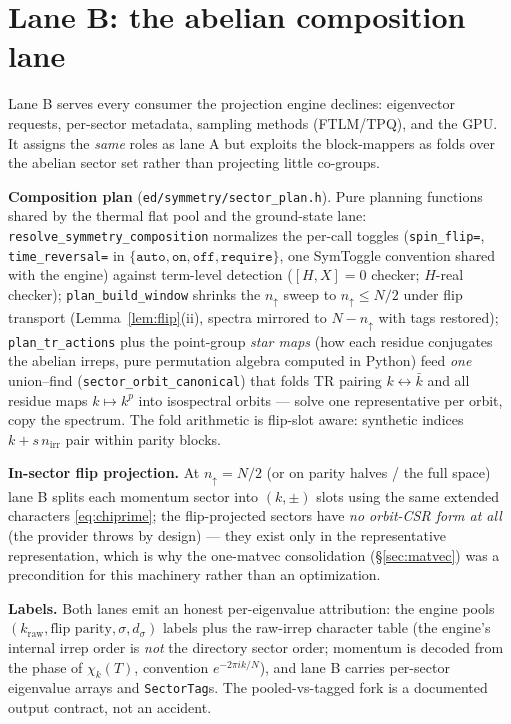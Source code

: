 \documentclass[11pt]{article}
\newcommand{\file}[1]{\texttt{\small #1}}
\begin{document}
\section{Lane B: the abelian composition lane}
\label{sec:laneb}

Lane B serves every consumer the projection engine declines: eigenvector
requests, per-sector metadata, sampling methods (FTLM/TPQ), and the GPU. It
assigns the \emph{same} roles as lane A but exploits the block-mappers as
folds over the abelian sector set rather than projecting little co-groups.

\textbf{Composition plan} (\file{ed/symmetry/sector\_plan.h}). Pure planning
functions shared by the thermal flat pool and the ground-state lane:
\texttt{resolve\_symmetry\_composition} normalizes the per-call toggles
(\texttt{spin\_flip=}, \texttt{time\_reversal=} in
$\{\texttt{auto},\texttt{on},\texttt{off},\texttt{require}\}$, one SymToggle
convention shared with the engine) against term-level detection
($[H, X] = 0$ checker; $H$-real checker); \texttt{plan\_build\_window}
shrinks the $n_\uparrow$ sweep to $n_\uparrow \le N/2$ under flip transport
(Lemma~\ref{lem:flip}(ii), spectra mirrored to $N - n_\uparrow$ with tags
restored); \texttt{plan\_tr\_actions} plus the point-group \emph{star maps}
(how each residue conjugates the abelian irreps, pure permutation algebra
computed in Python) feed \emph{one} union--find
(\texttt{sector\_orbit\_canonical}) that folds TR pairing
$k \leftrightarrow \bar k$ and all residue maps $k \mapsto k^p$ into
isospectral orbits --- solve one representative per orbit, copy the
spectrum. The fold arithmetic is flip-slot aware: synthetic indices
$k + s\, n_{\mathrm{irr}}$ pair within parity blocks.

\textbf{In-sector flip projection.} At $n_\uparrow = N/2$ (or on parity
halves / the full space) lane B splits each momentum sector into
$(k, \pm)$ slots using the same extended characters \eqref{eq:chiprime};
the flip-projected sectors have \emph{no orbit-CSR form at all} (the
provider throws by design) --- they exist only in the representative
representation, which is why the one-matvec consolidation
(\S\ref{sec:matvec}) was a precondition for this machinery rather than an
optimization.

\textbf{Labels.} Both lanes emit an honest per-eigenvalue attribution: the
engine pools $(k_{\mathrm{raw}}, \text{flip parity}, \sigma, d_\sigma)$
labels plus the raw-irrep character table (the engine's internal irrep
order is \emph{not} the directory sector order; momentum is decoded from
the phase of $\chi_k(T)$, convention $e^{-2\pi i k/N}$), and lane B carries
per-sector eigenvalue arrays and \texttt{SectorTag}s. The pooled-vs-tagged
fork is a documented output contract, not an accident.
\end{document}
